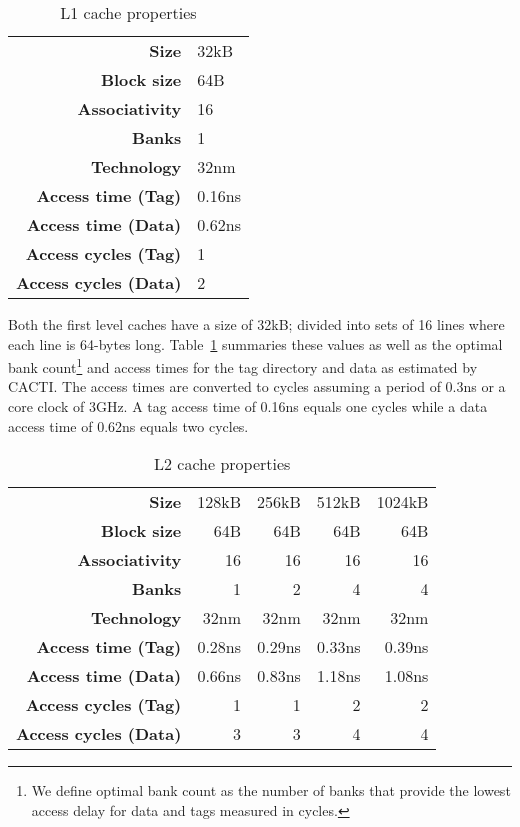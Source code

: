 \begin{table}[ht]
\centering
\begin{tabular}{rl}
\toprule
\bf{Size}               & 32kB              \\
\bf{Block size}         & 64B               \\
\bf{Associativity}      & 16                \\
\bf{Banks}              & 1                 \\
\bf{Technology}         & 32nm              \\
\bf{Access time (Tag)}  & 0.16ns \\
\bf{Access time (Data)} & 0.62ns \\
\bf{Access cycles (Tag)}  & 1 \\
\bf{Access cycles (Data)} & 2 \\
\bottomrule
\end{tabular}
\caption{L1 cache properties}
\label{tbl:processor_model:l1}
\end{table}

Both the first level caches have a size of 32kB; divided into sets of 16 lines where each line is 64-bytes long.
Table~\ref{tbl:processor_model:l1} summaries these values as well as the optimal bank count\footnote{We define optimal bank count as the number of banks that provide the lowest access delay for data and tags measured in cycles.} and access times for the tag directory and data as estimated by CACTI. 
The access times are converted to cycles assuming a period of 0.3ns or a core clock of 3GHz. 
A tag access time of 0.16ns equals one cycles while a data access time of 0.62ns equals two cycles.

\begin{table}[ht]
\centering
\begin{tabular}{rrrrr}
\toprule
\bf{Size}                 & 128kB       & 256kB       & 512kB       & 1024kB            \\
\bf{Block size}           & 64B         & 64B         & 64B         & 64B               \\
\bf{Associativity}        & 16          & 16          & 16          & 16                \\
\bf{Banks}                & 1           & 2           & 4           & 4                 \\
\bf{Technology}           & 32nm        & 32nm        & 32nm        & 32nm              \\
\bf{Access time (Tag)}    & 0.28ns      & 0.29ns      & 0.33ns      & 0.39ns            \\
\bf{Access time (Data)}   & 0.66ns      & 0.83ns      & 1.18ns      & 1.08ns            \\
\bf{Access cycles (Tag)}  & 1           & 1           & 2           & 2                 \\
\bf{Access cycles (Data)} & 3           & 3           & 4           & 4                 \\
\bottomrule
\end{tabular}
\caption{L2 cache properties}
\label{tbl:processor_model:l2}
\end{table}


